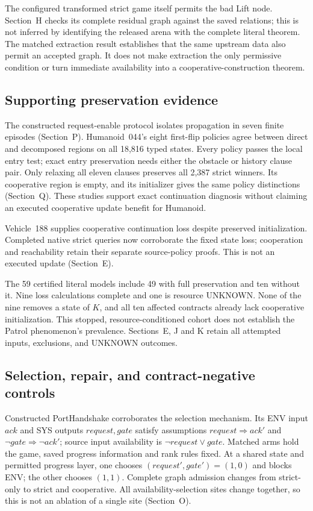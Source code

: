 The configured transformed strict game itself permits the bad Lift node.
Section~H checks its complete residual graph against the saved relations;
this is not inferred by identifying the released arena with the complete
literal theorem. The matched extraction result establishes that the same
upstream data also permit an accepted graph. It does not make extraction
the only permissive condition or turn immediate availability into a
cooperative-construction theorem.

\subsection*{Supporting preservation evidence}
The constructed request-enable protocol isolates propagation in seven
finite episodes (Section~P). Humanoid~044's eight first-flip policies
agree between direct and decomposed regions on all 18,816 typed states.
Every policy passes the local entry test; exact entry preservation needs
either the obstacle or history clause pair. Only relaxing all eleven
clauses preserves all 2,387 strict winners. Its cooperative region is
empty, and its initializer gives the same policy distinctions
(Section~Q). These studies support exact continuation diagnosis without
claiming an executed cooperative update benefit for Humanoid.

Vehicle~188 supplies cooperative continuation loss despite preserved
initialization. Completed native strict queries now corroborate the fixed
state loss; cooperation and reachability retain their separate source-policy
proofs. This is not an executed update (Section~E).

The 59 certified literal models include 49 with full preservation and
ten without it. Nine loss calculations complete and one is resource
UNKNOWN. None of the nine removes a state of $K$, and all ten affected
contracts already lack cooperative initialization. This stopped,
resource-conditioned cohort does not establish the Patrol phenomenon's
prevalence. Sections~E, J and K retain all attempted inputs, exclusions,
and UNKNOWN outcomes.

\subsection*{Selection, repair, and contract-negative controls}
Constructed PortHandshake corroborates the selection mechanism. Its
ENV input $ack$ and SYS outputs $request,gate$ satisfy assumptions
$request\Rightarrow ack'$ and $\neg gate\Rightarrow\neg ack'$;
source input availability is $\neg request\lor gate$. Matched arms hold
the game, saved progress information and rank rules fixed. At a shared
state and permitted progress layer, one chooses
$(request',gate')=(1,0)$ and blocks ENV; the other chooses $(1,1)$.
Complete graph admission changes from strict-only to strict and
cooperative. All availability-selection sites change together, so this
is not an ablation of a single site (Section~O).


